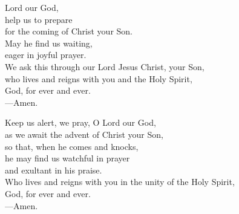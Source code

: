 \prayer


\begin{prayerverse}
Lord our God,\\
help us to prepare\\
for the coming of Christ your Son.\\
May he find us waiting,\\
eager in joyful prayer.\\
We ask this through our Lord Jesus Christ, your Son,\\
who lives and reigns with you and the Holy Spirit,\\
God, for ever and ever.\\
{\color{red}---\thinspace}Amen.
\end{prayerverse}


\begin{prayerverse}
Keep us alert, we pray, O Lord our God,\\
as we await the advent of Christ your Son,\\
so that, when he comes and knocks,\\
he may find us watchful in prayer\\
and exultant in his praise.\\
Who lives and reigns with you in the unity of the Holy Spirit,\\
God, for ever and ever.\\
{\color{red}---\thinspace}Amen.
\end{prayerverse}

